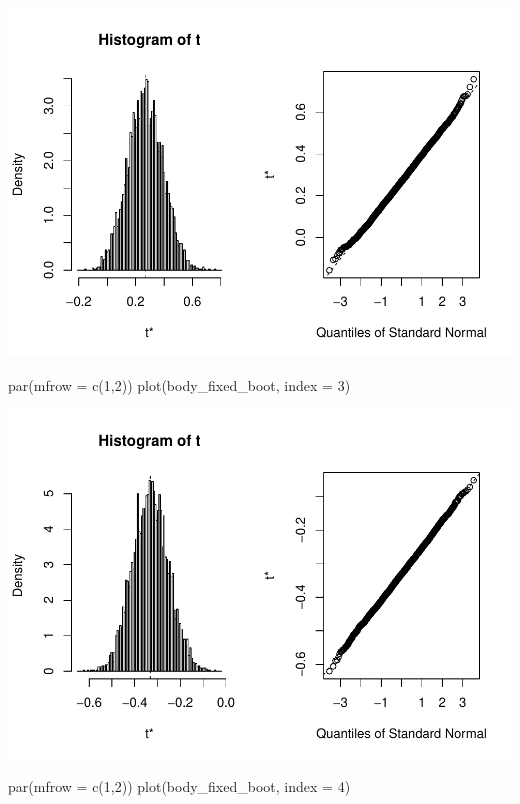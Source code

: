 \documentclass[
]{article}
\newenvironment{Shaded}{\begin{snugshade}}{\end{snugshade}}
\newcommand{\AttributeTok}[1]{\textcolor[rgb]{0.77,0.63,0.00}{#1}}
\newcommand{\DecValTok}[1]{\textcolor[rgb]{0.00,0.00,0.81}{#1}}
\newcommand{\FunctionTok}[1]{\textcolor[rgb]{0.00,0.00,0.00}{#1}}
\newcommand{\NormalTok}[1]{#1}
\begin{document}
\includegraphics{STAT641_Final_Report_files/figure-latex/unnamed-chunk-10-1.pdf}

\begin{Shaded}
\begin{Highlighting}[]
\FunctionTok{par}\NormalTok{(}\AttributeTok{mfrow =} \FunctionTok{c}\NormalTok{(}\DecValTok{1}\NormalTok{,}\DecValTok{2}\NormalTok{))}
\FunctionTok{plot}\NormalTok{(body\_fixed\_boot, }\AttributeTok{index =} \DecValTok{3}\NormalTok{)}
\end{Highlighting}
\end{Shaded}

\includegraphics{STAT641_Final_Report_files/figure-latex/unnamed-chunk-11-1.pdf}

\begin{Shaded}
\begin{Highlighting}[]
\FunctionTok{par}\NormalTok{(}\AttributeTok{mfrow =} \FunctionTok{c}\NormalTok{(}\DecValTok{1}\NormalTok{,}\DecValTok{2}\NormalTok{))}
\FunctionTok{plot}\NormalTok{(body\_fixed\_boot, }\AttributeTok{index =} \DecValTok{4}\NormalTok{)}
\end{Highlighting}
\end{Shaded}
\end{document}
